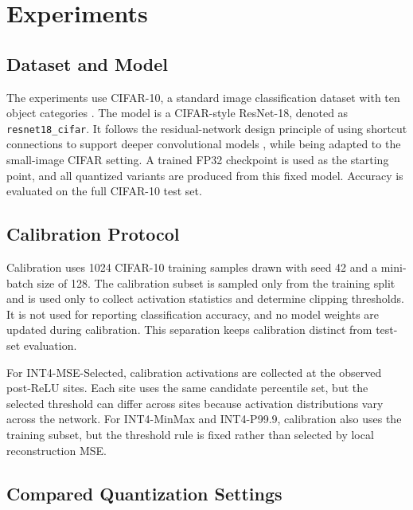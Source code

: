 
\section{Experiments}
\label{sec:experiments}

\subsection{Dataset and Model}
\label{subsec:dataset_model}

The experiments use CIFAR-10, a standard image classification dataset with ten object categories \cite{krizhevsky2009learning}. The model is a CIFAR-style ResNet-18, denoted as \texttt{resnet18\_cifar}. It follows the residual-network design principle of using shortcut connections to support deeper convolutional models \cite{he2016deep}, while being adapted to the small-image CIFAR setting. A trained FP32 checkpoint is used as the starting point, and all quantized variants are produced from this fixed model. Accuracy is evaluated on the full CIFAR-10 test set.

\subsection{Calibration Protocol}
\label{subsec:calibration_protocol}

Calibration uses 1024 CIFAR-10 training samples drawn with seed 42 and a mini-batch size of 128. The calibration subset is sampled only from the training split and is used only to collect activation statistics and determine clipping thresholds. It is not used for reporting classification accuracy, and no model weights are updated during calibration. This separation keeps calibration distinct from test-set evaluation.

For INT4-MSE-Selected, calibration activations are collected at the observed post-ReLU sites. Each site uses the same candidate percentile set, but the selected threshold can differ across sites because activation distributions vary across the network. For INT4-MinMax and INT4-P99.9, calibration also uses the training subset, but the threshold rule is fixed rather than selected by local reconstruction MSE.

\subsection{Compared Quantization Settings}
\label{subsec:compared_settings}

